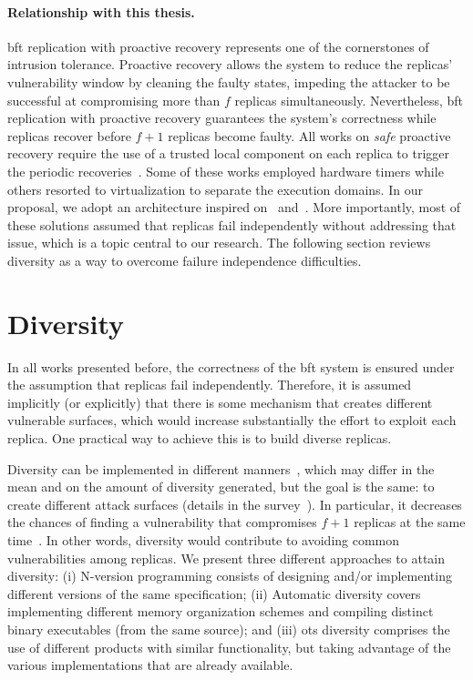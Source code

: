 \paragraph{Relationship with this thesis.} 
\gls{bft} replication with proactive recovery represents one of the cornerstones of intrusion tolerance. 
Proactive recovery allows the system to reduce the replicas' vulnerability window by cleaning the faulty states, impeding the attacker to be successful at compromising more than $f$ replicas simultaneously. 
Nevertheless, \gls{bft} replication with proactive recovery guarantees the system's correctness while replicas recover before $f+1$ replicas become faulty. 
All works on \emph{safe} proactive recovery require the use of a trusted local component on each replica to trigger the periodic recoveries~\cite{Castro:2002,Sousa:2010,Roeder:2010,Platania:2014,Distler:2011}.
Some of these works employed hardware timers while others resorted to virtualization to separate the execution domains. 
In our proposal, we adopt an architecture inspired on~\cite{Distler:2008} and~\cite{Sousa:2010}. 
More importantly, most of these solutions assumed that replicas fail independently without addressing that issue, which is a topic central to our research.
The following section reviews diversity as a way to overcome failure independence difficulties. 




\section{Diversity}
In all works presented before, the correctness of the \gls{bft} system is ensured under the assumption that replicas fail independently.
Therefore, it is assumed implicitly (or explicitly) that there is some mechanism that creates different vulnerable surfaces, which would increase substantially the effort to exploit each replica.
One practical way to achieve this is to build diverse replicas.

Diversity can be implemented in different manners~\cite{Deswarte:1998,Larsen:2015}, which may differ in the mean and on the amount of diversity generated, but the goal is the same: to create different attack surfaces (details in the survey~\cite{Baudry:2015}).
In particular, it decreases the chances of finding a vulnerability that compromises $f+1$ replicas at the same time~\cite{Castro:2002}.
In other words, diversity would contribute to avoiding common vulnerabilities among replicas. 
We present three different approaches to attain diversity: 
(i) N-version programming consists of designing and/or implementing  different versions of the same specification; 
(ii) Automatic diversity covers implementing different memory organization schemes and compiling distinct binary executables (from the same source); 
and (iii) \gls{ots} diversity comprises the use of different products with similar functionality, but taking advantage of the various implementations that are already available.


